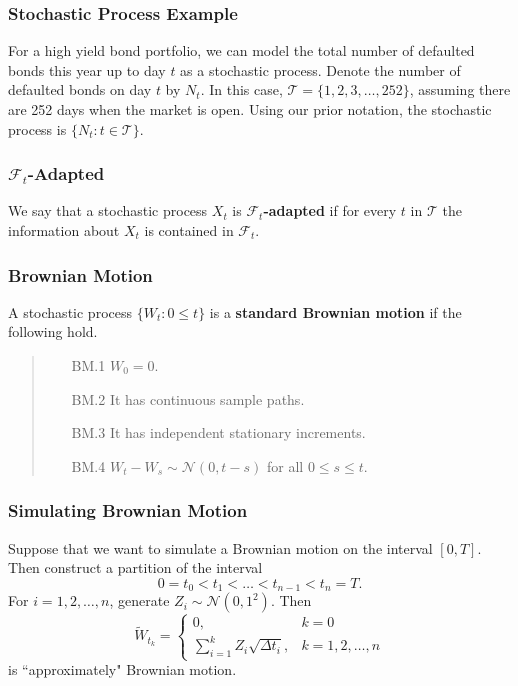 \documentclass{beamer}
\begin{document}
\begin{frame}
\frametitle{Stochastic Process Example}

\begin{Example}
For a high yield bond portfolio, we can model the total number of defaulted bonds this year up to day $t$ as a stochastic process. Denote the number of defaulted bonds on day $t$ by $N_t$. In this case, $\mathcal{T} = \{1, 2, 3,\ldots, 252\}$, assuming there are 252 days when the market is open. Using our prior notation, the stochastic process is $\{N_t : t\in\mathcal{T}\}$.
\end{Example}

\end{frame}

\begin{frame}

\frametitle{$\mathcal{F}_t$-Adapted}
\begin{Definition}
We say that a stochastic process $X_t$ is $\mathcal{F}_t${\bf-adapted} if for every $t$ in $\mathcal{T}$ the information about $X_t$ is contained in $\mathcal{F}_t$.
\end{Definition}
\end{frame}

\begin{frame}
\frametitle{Brownian Motion}
\begin{Definition}
A stochastic process $\{W_t : 0\leq t\}$ is a {\bf standard Brownian motion} if the following hold.
\medskip

\begin{quote}
\begin{enumerate}
\item[BM.1] $W_0 = 0$.
\item[BM.2] It has continuous sample paths.
\item[BM.3] It has independent stationary increments.
\item[BM.4] $W_t - W_s \sim{\mathcal{N}(0, t - s)}$ for all $0\leq s \leq t$.
\end{enumerate}
\end{quote}
\end{Definition}
\end{frame}

\begin{frame}
\frametitle{Simulating Brownian Motion}
Suppose that we want to simulate a Brownian motion on the interval $[0, T]$. Then construct a partition of the interval
$$
0 = t_0 < t_1 <\ldots < t_{n - 1} < t_n = T.
$$
For $i = 1, 2,\ldots, n$, generate $Z_i\sim{\mathcal{N}(0, 1^2)}$. Then 
$$
\widetilde{W}_{t_k} = \begin{cases} 0	,	&	k = 0\\
						\sum_{i = 1}^k Z_i \sqrt{\Delta t_i},	&	k = 1, 2,\ldots, n
						\end{cases}
$$
is ``approximately" Brownian motion.
\end{frame}
\end{document}

